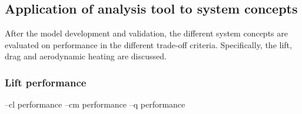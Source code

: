 \subsection{Application of analysis tool to system concepts}
\label{subsec:appaeroanal}
After the model development and validation, the different system concepts are evaluated on performance in the different trade-off criteria. Specifically, the lift, drag and aerodynamic heating are discussed.
\subsubsection{Lift performance}

--cl performance
--cm performance
--q	 performance
